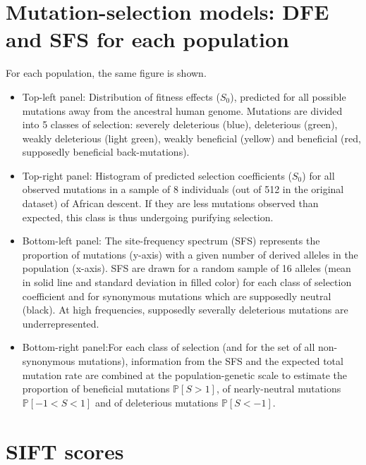 \documentclass{article}
\newcommand{\proba}{\mathbb{P}}
\newcommand{\Sphy}{S_{0}}
\newcommand{\Spop}{S}
\newcommand{\polyDel}{\Spop < -1}
\newcommand{\polyNeutral}{-1 < \Spop < 1}
\newcommand{\polyAdv}{ \Spop > 1}
\newcommand{\PpolyDel}{\proba \left[ \polyDel \right]}
\newcommand{\PpolyNeutral}{\proba \left[ \polyNeutral \right]}
\newcommand{\PpolyAdv}{\proba \left[ \polyAdv \right]}
\begin{document}
    \section{Mutation-selection models: DFE and SFS for each population}\label{sec:mutation-selection-models:-histograms-and-sfs-for-each-population}
    For each population, the same figure is shown.
    \begin{itemize}
        \item Top-left panel: Distribution of fitness effects ($\Sphy$), predicted for all possible mutations away from the ancestral human genome.
        Mutations are divided into 5 classes of selection: severely deleterious (blue), deleterious (green), weakly deleterious (light green), weakly beneficial (yellow) and beneficial (red, supposedly beneficial back-mutations).
        \item Top-right panel: Histogram of predicted selection coefficients ($\Sphy$) for all observed mutations in a sample of 8 individuals (out of 512 in the original dataset) of African descent.
        If they are less mutations observed than expected, this class is thus undergoing purifying selection.
        \item Bottom-left panel: The site-frequency spectrum (SFS) represents the proportion of mutations (y-axis) with a given number of derived alleles in the population (x-axis).
        SFS are drawn for a random sample of 16 alleles (mean in solid line and standard deviation in filled color) for each class of selection coefficient and for synonymous mutations which are supposedly neutral (black).
        At high frequencies, supposedly severally deleterious mutations are underrepresented.
        \item Bottom-right panel:For each class of selection (and for the set of all non-synonymous mutations), information from the SFS and the expected total mutation rate are combined at the population-genetic scale to estimate the proportion of beneficial mutations $\PpolyAdv$, of nearly-neutral mutations $\PpolyNeutral$ and of deleterious mutations $\PpolyDel$.
    \end{itemize}

    

    \newpage


    \section{SIFT scores}\label{sec:sift-scores}
\end{document}
